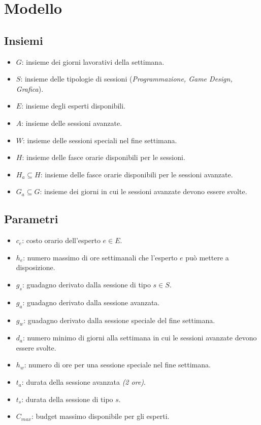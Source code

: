 \documentclass[12pt]{article}
\begin{document}
    \section{Modello}
    \subsection{Insiemi}
    \begin{itemize}
        \item $G$: insieme dei giorni lavorativi della settimana.
        \item $S$: insieme delle tipologie di sessioni (\textit{Programmazione, Game Design, Grafica}).
        \item $E$: insieme degli esperti disponibili.
        \item $A$: insieme delle sessioni avanzate.
        \item $W$: insieme delle sessioni speciali nel fine settimana.
        \item $H$: insieme delle fasce orarie disponibili per le sessioni.
        \item $H_a \subseteq H$: insieme delle fasce orarie disponibili per le sessioni avanzate.
        \item $G_a \subseteq G$: insieme dei giorni in cui le sessioni avanzate devono essere svolte.
    \end{itemize}
    \subsection{Parametri}
    \begin{itemize}
        \item $c_{e}$: costo orario dell'esperto $e \in E$.
        \item $h_{e}$: numero massimo di ore settimanali che l'esperto $e$ può mettere a disposizione.
        \item $g_{s}$: guadagno derivato dalla sessione di tipo $s \in S$.
        \item $g_{a}$: guadagno derivato dalla sessione avanzata.
        \item $g_{w}$: guadagno derivato dalla sessione speciale del fine settimana.
        \item $d_{a}$: numero minimo di giorni alla settimana in cui le sessioni avanzate devono essere svolte.
        \item $h_{w}$: numero di ore per una sessione speciale nel fine settimana.
        \item $t_{a}$: durata della sessione avanzata \textit{(2 ore)}.
        \item $t_{s}$: durata della sessione di tipo $s$.
        \item $C_{max}$: budget massimo disponibile per gli esperti.
    \end{itemize}
\end{document}
